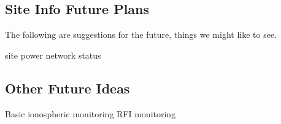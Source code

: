 \documentclass{article}
\begin{document}
\subsection{Site Info Future Plans}
\label{sec:site_future}
The following are suggestions for the future, things we might like to see.
\begin{outline}[enumerate]
	\1 site power
	\1 network status
\end{outline}



\subsection{Other Future Ideas}
\begin{outline}[enumerate]
	\1 Basic ionospheric monitoring
	\1 RFI monitoring
\end{outline}
\end{document}
